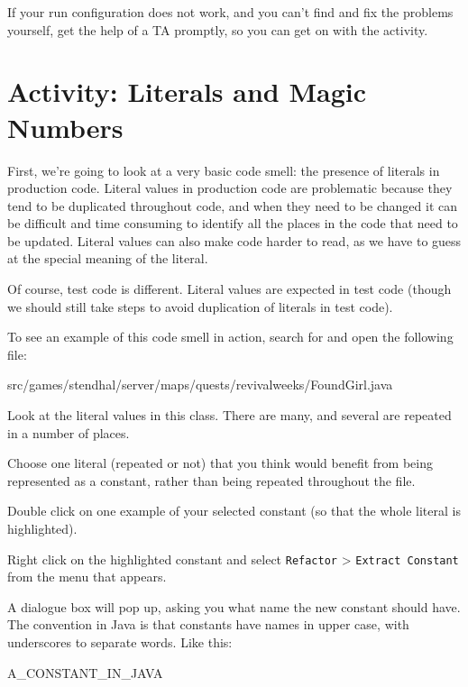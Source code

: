 \documentclass[
]{book}
\newenvironment{Shaded}{\begin{snugshade}}{\end{snugshade}}
\newcommand{\NormalTok}[1]{#1}
\begin{document}
If your run configuration does not work, and you can't find and fix the problems yourself, get the help of a TA promptly, so you can get on with the activity.

\hypertarget{magic}{%
\section{Activity: Literals and Magic Numbers}\label{magic}}

First, we're going to look at a very basic code smell: the presence of literals in production code. Literal values in production code are problematic because they tend to be duplicated throughout code, and when they need to be changed it can be difficult and time consuming to identify all the places in the code that need to be updated. Literal values can also make code harder to read, as we have to guess at the special meaning of the literal.

Of course, test code is different. Literal values are expected in test code (though we should still take steps to avoid duplication of literals in test code).

To see an example of this code smell in action, search for and open the following file:

\begin{Shaded}
\begin{Highlighting}[]
\NormalTok{src/games/stendhal/server/maps/quests/revivalweeks/FoundGirl.java}
\end{Highlighting}
\end{Shaded}

Look at the literal values in this class. There are many, and several are repeated in a number of places.

Choose one literal (repeated or not) that you think would benefit from being represented as a constant, rather than being repeated throughout the file.

Double click on one example of your selected constant (so that the whole literal is highlighted).

Right click on the highlighted constant and select \texttt{Refactor} \textgreater{} \texttt{Extract\ Constant} from the menu that appears.

A dialogue box will pop up, asking you what name the new constant should have. The convention in Java is that constants have names in upper case, with underscores to separate words. Like this:

\begin{Shaded}
\begin{Highlighting}[]
\NormalTok{A\_CONSTANT\_IN\_JAVA}
\end{Highlighting}
\end{Shaded}
\end{document}
